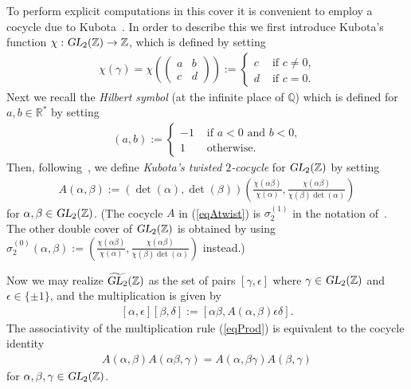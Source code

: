 \documentclass[aps,prd,groupedaddress,preprint,tightenlines,eqsecnum,nofootinbib]{revtex4}
\newcommand{\g}{\gamma}
\newcommand{\e}{\epsilon}
\newcommand{\GL}{\operatorname{\textsl{GL}}}      %
\newcommand{\RR}{{\mathbb R}}%
\newcommand{\Z}{{\mathbb Z}}%
\newcommand{\QQ}{{\mathbb Q}}%
\newcommand{\A}{\alpha}
\newcommand{\B}{\beta}
\begin{document}
To perform explicit computations in this cover it is convenient to employ a cocycle due to Kubota~\cite{10-Kubota}. In order to describe this we first introduce Kubota's 
function $\chi:\GL_2(\Z)\to \Z$, which is defined by setting
\begin{align}
\label{eqn:Kubotachi}
\chi(\g) = \chi\left(\left(\begin{smallmatrix} a&b\\c&d\end{smallmatrix}\right)\right):=
\begin{cases}
	c&\text{ if $c\neq 0$,}\\
	d&\text{ if $c=0$.}
\end{cases}
\end{align}
Next we recall the {\em Hilbert symbol} (at the infinite place of $\QQ$) which is defined for $a,b\in \RR^*$ by setting
\begin{align}
\label{eqn:Hilbertsymbol}
(a,b):=
\begin{cases}
	-1&\text{ if $a<0$ and $b<0$,}\\
	1&\text{ otherwise.}
\end{cases}
\end{align}
Then, following~\cite{11-Budden-Goehle}, we define {\em Kubota's twisted $2$-cocycle} for $\GL_2(\Z)$ by setting
\begin{align}
\label{eqAtwist}
A(\A,\B):=
\left(\det(\A),\det(\B)\right)
\left(\frac{\chi(\A\B)}{\chi(\A)},\frac{\chi(\A\B)}{\chi(\B)\det(\A)}\right)
\end{align}
for $\A,\B\in\GL_2(\Z)$. (The cocycle $A$ in (\ref{eqAtwist}) is $\sigma_2^{(1)}$ in the notation of~\cite{11-Budden-Goehle}. The other double cover of $\GL_2(\Z)$ is obtained by using $\sigma_2^{(0)}(\A,\B):= \left(\frac{\chi(\A\B)}{\chi(\A)},\frac{\chi(\A\B)}{\chi(\B)\det(\A)}\right)$ instead.)

Now we may realize $\widetilde{\GL_2}(\Z)$ as the set of pairs $[\g,\e]$ where $\g \in \GL_2(\Z)$ and $\e\in\{\pm 1\}$, and the multiplication is given by
\begin{align}
\label{eqProd}
	[\A,\e][\B,\delta]:=[\A\B,A(\A,\B)\e\delta].
\end{align}
The associativity of the multiplication rule (\ref{eqProd}) is equivalent to the cocycle identity 
\begin{gather}\label{eqn:cocycleidentityA}
	A(\A,\B)A(\A\B,\g)=A(\A,\B\g)A(\B,\g)
\end{gather}
for $\A,\B,\g\in \GL_2(\Z)$.
\end{document}
